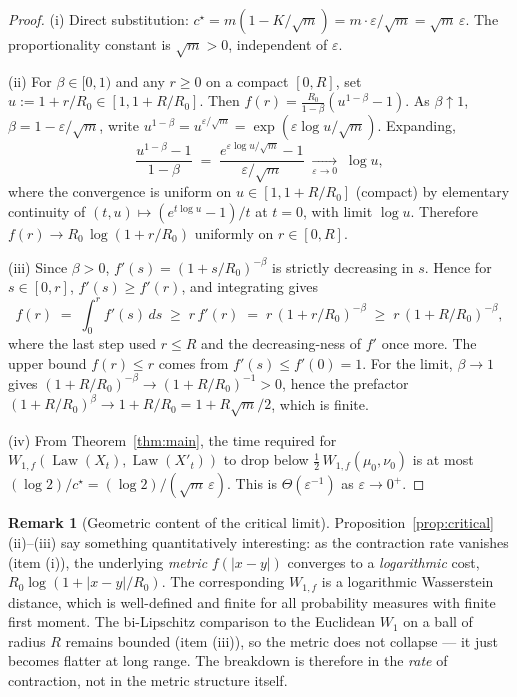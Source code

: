 \documentclass[11pt]{article}
\theoremstyle{definition}
\newtheorem{remark}[theorem]{Remark}
\DeclareMathOperator{\Law}{Law}
\newcommand{\abs}[1]{\left\lvert #1 \right\rvert}
\begin{document}
\begin{proof}
(i) Direct substitution: $c^\star = m(1 - K/\sqrt m) = m \cdot \varepsilon/\sqrt m = \sqrt m\,\varepsilon$. The proportionality constant is $\sqrt m > 0$, independent of $\varepsilon$.

(ii) For $\beta \in [0, 1)$ and any $r \ge 0$ on a compact $[0, R]$, set $u := 1 + r/R_0 \in [1, 1 + R/R_0]$. Then $f(r) = \frac{R_0}{1 - \beta}(u^{1 - \beta} - 1)$. As $\beta \uparrow 1$, $\beta = 1 - \varepsilon/\sqrt m$, write $u^{1-\beta} = u^{\varepsilon/\sqrt m} = \exp(\varepsilon \log u/\sqrt m)$. Expanding,
\[
\frac{u^{1-\beta} - 1}{1 - \beta} \;=\; \frac{e^{\varepsilon \log u /\sqrt m} - 1}{\varepsilon/\sqrt m} \;\xrightarrow[\varepsilon \to 0]{}\; \log u,
\]
where the convergence is uniform on $u \in [1, 1 + R/R_0]$ (compact) by elementary continuity of $(t, u) \mapsto (e^{t \log u} - 1)/t$ at $t = 0$, with limit $\log u$. Therefore $f(r) \to R_0\,\log(1 + r/R_0)$ uniformly on $r \in [0, R]$.

(iii) Since $\beta > 0$, $f'(s) = (1 + s/R_0)^{-\beta}$ is strictly decreasing in $s$. Hence for $s \in [0, r]$, $f'(s) \ge f'(r)$, and integrating gives
\[
f(r) \;=\; \int_0^r f'(s)\,ds \;\ge\; r\,f'(r) \;=\; r\,(1 + r/R_0)^{-\beta} \;\ge\; r\,(1 + R/R_0)^{-\beta},
\]
where the last step used $r \le R$ and the decreasing-ness of $f'$ once more. The upper bound $f(r) \le r$ comes from $f'(s) \le f'(0) = 1$. For the limit, $\beta \to 1$ gives $(1 + R/R_0)^{-\beta} \to (1 + R/R_0)^{-1} > 0$, hence the prefactor $(1 + R/R_0)^{\beta} \to 1 + R/R_0 = 1 + R\sqrt m/2$, which is finite.

(iv) From Theorem~\ref{thm:main}, the time required for $W_{1,f}(\Law(X_t), \Law(X'_t))$ to drop below $\tfrac{1}{2}\,W_{1,f}(\mu_0, \nu_0)$ is at most $(\log 2)/c^\star = (\log 2)/(\sqrt m\,\varepsilon)$. This is $\Theta(\varepsilon^{-1})$ as $\varepsilon \to 0^+$.
\end{proof}

\begin{remark}[Geometric content of the critical limit]
Proposition~\ref{prop:critical}(ii)--(iii) say something quantitatively interesting: as the contraction rate vanishes (item (i)), the underlying \emph{metric} $f(\abs{x-y})$ converges to a \emph{logarithmic} cost, $R_0 \log(1 + \abs{x-y}/R_0)$. The corresponding $W_{1,f}$ is a logarithmic Wasserstein distance, which is well-defined and finite for all probability measures with finite first moment. The bi-Lipschitz comparison to the Euclidean $W_1$ on a ball of radius $R$ remains bounded (item (iii)), so the metric does not collapse --- it just becomes flatter at long range. The breakdown is therefore in the \emph{rate} of contraction, not in the metric structure itself.
\end{remark}
\end{document}
